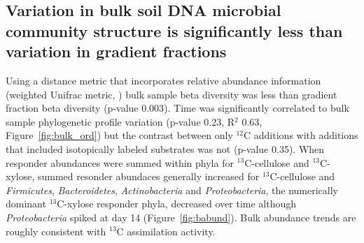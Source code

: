 \subsection{Variation in bulk soil DNA microbial community structure is
significantly less than variation in gradient fractions} 
Using a distance metric that incorporates relative abundance information
(weighted Unifrac metric, \citep{Lozupone_2005}) bulk sample beta diversity was
less than gradient fraction beta diversity (p-value 0.003). Time was
significantly correlated to bulk sample phylogenetic profile variation (p-value
0.23, R$^{2}$ 0.63, Figure~\ref{fig:bulk_ord}) but the contrast between only
$^{12}$C additions with additions that included isotopically labeled substrates
was not (p-value 0.35). When responder abundances were summed within phyla for
$^{13}$C-cellulose and $^{13}$C-xylose, summed resonder abundaces generally 
increased for $^{13}$C-cellulose and \textit{Firmicutes}, \textit{Bacteroidetes},
\textit{Actinobacteria} and \textit{Proteobacteria}, the numerically dominant
$^{13}$C-xylose responder phyla, decreased over time although 
\textit{Proteobacteria} spiked at day 14 (Figure~\ref{fig:babund}). Bulk abundance trends are
roughly consistent with $^{13}$C assimilation activity. 